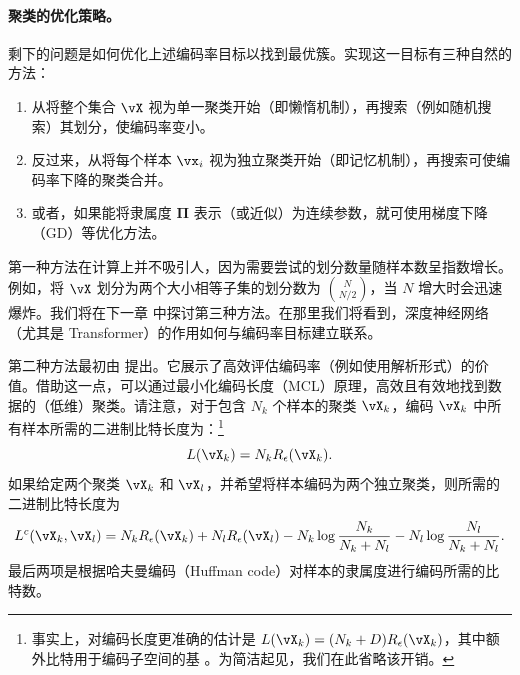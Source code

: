 \documentclass[../../book-main_zh.tex]{subfiles}
\begin{document}
\paragraph{聚类的优化策略。}
剩下的问题是如何优化上述编码率目标以找到最优簇。实现这一目标有三种自然的方法：
\begin{enumerate}
    \item 从将整个集合 $\vX$ 视为单一聚类开始（即懒惰机制），再搜索（例如随机搜索）其划分，使编码率变小。
    \item 反过来，从将每个样本 $\vx_i$ 视为独立聚类开始（即记忆机制），再搜索可使编码率下降的聚类合并。
    \item 或者，如果能将隶属度 $\boldsymbol{\Pi}$ 表示（或近似）为连续参数，就可使用梯度下降（GD）等优化方法。
\end{enumerate}
第一种方法在计算上并不吸引人，因为需要尝试的划分数量随样本数呈指数增长。例如，将 $\vX$ 划分为两个大小相等子集的划分数为 $N \choose N/2$，当 $N$ 增大时会迅速爆炸。我们将在下一章  中探讨第三种方法。在那里我们将看到，深度神经网络（尤其是 Transformer）的作用如何与编码率目标建立联系。

第二种方法最初由 \cite{ma2007segmentation} 提出。它展示了高效评估编码率（例如使用解析形式）的价值。借助这一点，可以通过最小化编码长度（MCL）原理，高效且有效地找到数据的（低维）聚类。请注意，对于包含 $N_k$ 个样本的聚类 $\vX_k$，编码 $\vX_k$ 中所有样本所需的二进制比特长度为：\footnote{事实上，对编码长度更准确的估计是 $L(\vX_k) = (N_k+D) R_\epsilon(\vX_k)$，其中额外比特用于编码子空间的基 \cite{ma2007segmentation}。为简洁起见，我们在此省略该开销。}
\begin{equation}
    L(\vX_k) = N_k R_\epsilon(\vX_k).
\end{equation}
如果给定两个聚类 $\vX_k$ 和 $\vX_l$，并希望将样本编码为两个独立聚类，则所需的二进制比特长度为
\begin{equation*}
    L^c(\vX_k, \vX_l) = N_k R_\epsilon(\vX_k) + N_l R_\epsilon(\vX_l) -
    N_k \log\frac{N_k}{N_k + N_l} - N_l \log\frac{N_l}{N_k + N_l}.
\end{equation*}
最后两项是根据哈夫曼编码（Huffman code）对样本的隶属度进行编码所需的比特数。
\end{document}
